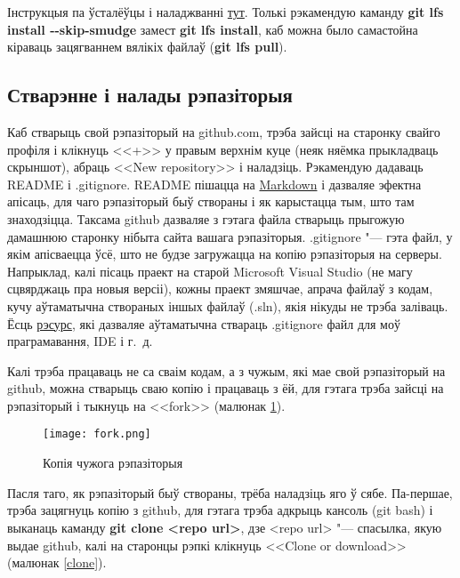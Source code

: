\documentclass[12pt, a4paper]{extarticle}
\begin{document}
    Інструкцыя па ўсталёўцы і наладжванні \href{https://github.com/git-lfs/git-lfs}{тут}. Толькі рэкамендую каманду \textbf{git lfs install -\hspace{1pt}-skip-smudge} замест \textbf{git lfs install}, каб можна было самастойна кіраваць зацягваннем вялікіх файлаў (\textbf{git lfs pull}). 
    
    \subsection{Стварэнне і налады рэпазіторыя}
    Каб стварыць свой рэпазіторый на github.com, трэба зайсці на старонку свайго профіля і клікнуць <<+>> у правым верхнім куце (неяк няёмка прыкладваць скрыншот), абраць <<New repository>> і наладзіць. Рэкамендую дадаваць README і .gitignore. README пішацца на \href{https://en.wikipedia.org/wiki/Markdown}{Markdown} і дазваляе эфектна апісаць, для чаго рэпазіторый быў створаны і як карыстацца тым, што там знаходзіцца. Таксама github дазваляе з гэтага файла стварыць прыгожую дамашнюю старонку нібыта сайта вашага рэпазіторыя. .gitignore "--- гэта файл, у якім апісваецца ўсё, што не будзе загружацца на копію рэпазіторыя на серверы. Напрыклад, калі пісаць праект на старой Microsoft Visual Studio (не магу сцвярджаць пра новыя версіі), кожны праект змяшчае, апрача файлаў з кодам, кучу аўтаматычна створаных іншых файлаў (.sln), якія нікуды не трэба заліваць. Ёсць \href{https://www.gitignore.io}{рэсурс}, які дазваляе аўтаматычна ствараць .gitignore файл для моў праграмавання, IDE і г.~д.
    
    Калі трэба працаваць не са сваім кодам, а з чужым, які мае свой рэпазіторый на github, можна стварыць сваю копію і працаваць з ёй, для гэтага трэба зайсці на рэпазіторый і тыкнуць на <<fork>> (малюнак \ref{fork}).
    
    \begin{figure}[H]
        \begin{center}
            \texttt{[image: fork.png]}
        \end{center}
        \caption{Копія чужога рэпазіторыя} \label{fork}
    \end{figure}
    
    Пасля таго, як рэпазіторый быў створаны, трёба наладзіць яго ў сябе. Па-першае, трэба зацягнуць копію з github, для гэтага трэба адкрыць кансоль (git bash) і выканаць каманду \textbf{git clone <repo url>}, дзе <repo url> "--- спасылка, якую выдае github, калі на старонцы рэпкі клікнуць <<Clone or download>> (малюнак \ref{clone}).
    
\end{document}
